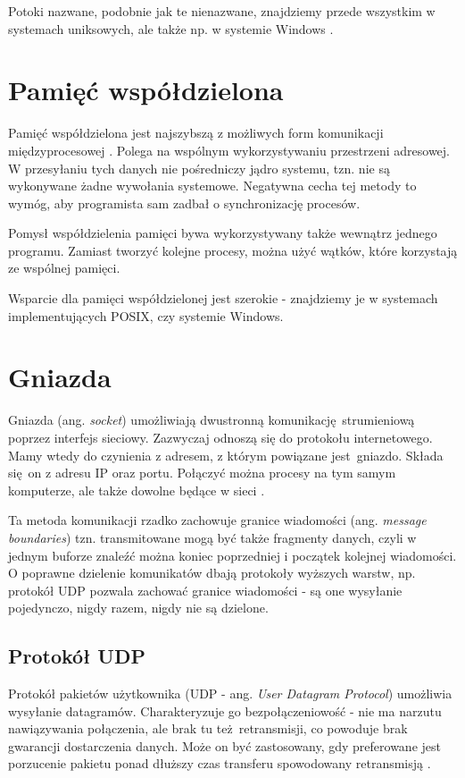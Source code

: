 Potoki nazwane, podobnie jak te nienazwane, znajdziemy przede wszystkim w systemach uniksowych, ale także np. w systemie Windows \cite{NAMED_PIPE_WIN}.


\section{Pamięć współdzielona}

Pamięć współdzielona jest najszybszą z możliwych form komunikacji międzyprocesowej \cite{Ste92}. Polega na wspólnym wykorzystywaniu przestrzeni adresowej. W przesyłaniu tych danych nie pośredniczy jądro systemu, tzn. nie są wykonywane żadne wywołania systemowe. Negatywna cecha tej metody to wymóg, aby programista sam zadbał o synchronizację procesów.

Pomysł współdzielenia pamięci bywa wykorzystywany także wewnątrz jednego programu. Zamiast tworzyć kolejne procesy, można użyć wątków, które korzystają ze wspólnej pamięci.

Wsparcie dla pamięci współdzielonej jest szerokie - znajdziemy je w systemach implementujących POSIX, czy systemie Windows.

\section{Gniazda}

Gniazda (ang. \textit{socket}) umożliwiają dwustronną komunikację strumieniową poprzez interfejs sieciowy. Zazwyczaj odnoszą się do protokołu internetowego. Mamy wtedy do czynienia z adresem, z którym powiązane jest gniazdo. Składa się on z adresu IP oraz portu. Połączyć można procesy na tym samym komputerze, ale także dowolne będące w sieci \cite{sock_prgr}.

Ta metoda komunikacji rzadko zachowuje granice wiadomości (ang. \textit{message boundaries}) tzn. transmitowane mogą być także fragmenty danych, czyli w jednym buforze znaleźć można koniec poprzedniej i początek kolejnej wiadomości. O poprawne dzielenie komunikatów dbają protokoły wyższych warstw, np. protokół UDP pozwala zachować granice wiadomości - są one wysyłanie pojedynczo, nigdy razem, nigdy nie są dzielone.


\subsection{Protokół UDP}

Protokół pakietów użytkownika (UDP - ang. \textit{User Datagram Protocol}) umożliwia wysyłanie datagramów. Charakteryzuje go bezpołączeniowość - nie ma narzutu nawiązywania połączenia, ale brak tu też retransmisji, co powoduje brak gwarancji dostarczenia danych. Może on być zastosowany, gdy preferowane jest porzucenie pakietu ponad dłuższy czas transferu spowodowany retransmisją \cite{UDP_RFC}.


